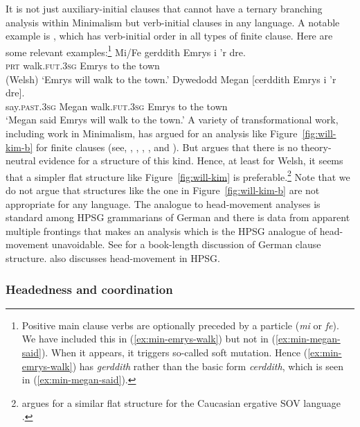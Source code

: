 \documentclass[output=paper
	        ,collection
	        ,collectionchapter
 	        ,biblatex
                ,babelshorthands
                ,newtxmath
                ,draftmode
                ,colorlinks, citecolor=brown
]{langscibook}
\begin{document}
It is not just  auxiliary-initial clauses that cannot have a ternary branching analysis
within Minimalism but verb-initial clauses in any language. A notable example is , which
has verb-initial order in all types of finite clause. Here are some relevant examples:\footnote{%
	Positive main clause verbs are optionally preceded by a particle (\emph{mi} or \emph{fe}). We have included this in (\ref{ex:min-emrys-walk}) but not in (\ref{ex:min-megan-said}). When it appears, it triggers so-called soft mutation. Hence (\ref{ex:min-emrys-walk}) has \emph{gerddith} rather than the basic form \emph{cerddith}, which is seen in (\ref{ex:min-megan-said}).
}
\eal
\ex\label{ex:min-emrys-walk}
\gll Mi/Fe gerddith Emrys i 'r dre.\\
     \textsc{prt} walk.\textsc{fut}.\textsc{3sg} Emrys to the town\\\hfill(Welsh)
\glt `Emrys will walk to the town.'
\ex\label{ex:min-megan-said}
\gll Dywedodd Megan [cerddith Emrys i 'r dre].\\
     say.\textsc{past}.\textsc{3sg} Megan \spacebr{}walk.\textsc{fut}.\textsc{3sg} Emrys to the town\\
\glt `Megan said Emrys will walk to the town.'
\zl
A variety of transformational work, including work in Minimalism, has argued for an analysis like Figure~\ref{fig:will-kim-b} for  finite clauses (see, \eg \citealt{JonesThomas.1977}, \citealt{Sproat.1985}, \citealt{Sadler.1988}, \citealt{Rouveret.1994}, and \citealt{Roberts.2005}). But \citet{Borsley.2006b} argues that there is no theory-neutral evidence for a structure of this kind. Hence, at least for Welsh, it seems that a simpler flat structure like Figure~\ref{fig:will-kim} is preferable.\footnote{%
	\citet{Borsley.2016} argues for a similar flat structure for the Caucasian ergative SOV language .%
} Note that we do not argue that structures like the one in Figure~\ref{fig:will-kim-b} are not
appropriate for any language. The analogue to head-movement analyses is standard among HPSG grammarians of German and there is data from apparent multiple
frontings that makes an analysis which is the HPSG analogue of head-movement unavoidable. See  for a
book-length discussion of German clause structure.  also discusses
head-movement in HPSG.


\subsubsection{Headedness and coordination}
\label{sec-coordination-minimalism}
\end{document}
